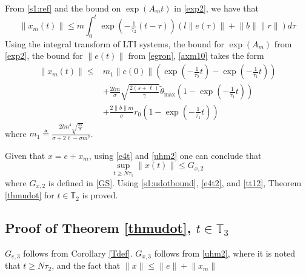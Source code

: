 \documentclass[10pt,journal]{IEEEtran}
\theoremstyle{plain}%
\theoremstyle{definition}
\newcommand{\be}[0]{\begin{equation}}
\newcommand{\ee}[0]{\end{equation}}
\newcommand{\norms}[1]{\lVert#1\rVert}
\newcommand{\normB}[0]{\norms}
\let\norm=\normB
\begin{document}
From \eqref{s1:ref} and the bound on $\exp(A_m t)$ in \eqref{exp2}, we have that
\be\label{axm10}
\norm{x_m(t)}\leq  m \int_0^t  \exp\left( -\tfrac{1}{\tau_2} (t-\tau) \right) \left( l \norm{ e(\tau)}+\norm b \norm r\right) d \tau \ee 
Using the integral transform of LTI systems, the bound for $\exp(A_m)$ from \eqref{exp2}, the bound for $\norm{e(t)}$ from \eqref{egron}, \eqref{axm10} takes the form
\be\label{uhm2}\begin{split}
\norm {x_m(t)} \leq & m_1 \norm {e(0) }\left( \exp\left(-\tfrac{1}{\tau_2}t\right) -\exp\left(-\tfrac{1}{\tau_1}t\right) \right) \\ &+ \frac{ 2lm }{\sigma} \sqrt{\frac{2(s+\ell)}{\gamma}}\tilde\theta_\text{max}\left( 1-\exp\left(-\tfrac{1}{\tau_1}t\right) \right) \\
&+ \frac{ 2 \norm{b} m} {\sigma} r_0  \left( 1-\exp\left(-\tfrac{1}{\tau_1}t\right) \right)
\end{split}\ee
where $m_1 \triangleq \frac{2lm^4\sqrt{\frac{2s}{\sigma}}}{\sigma+2\ell-\sigma m^2}$. 
 
Given that $x=e+x_m$, using \eqref{e4t} and \eqref{uhm2} one can conclude that 
\be\label{tt12}
\sup_{t\geq N\tau_1} \norm{x(t)}\leq G_{x,2}
\ee
where $G_{x,2}$ is defined in \eqref{GS}. Using \eqref{s1:udotbound}, \eqref{e4t2}, and \eqref{tt12}, Theorem \ref{thmudot} for $t\in\mathbb T_2$ is proved.


\subsection{Proof of Theorem \ref{thmudot}, $t\in\mathbb T_3$} \label{ut3}
$G_{e,3}$ follows from Corollary \ref{Tdef}. $G_{x,3}$ follows from \eqref{uhm2}, where it is noted that $t\geq N\tau_2$, and the fact that $\norm x \leq \norm e + \norm{x_m}$
\end{document}
